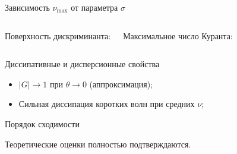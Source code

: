 \documentclass[12pt, aspectratio=169]{beamer}
\begin{document}
\begin{frame}{Зависимость $\nu_{\max}$ от параметра $\sigma$}
\begin{columns}[T]
Поверхность дискриминанта:


\hspace*{-2.5cm}
\scalebox{0.45}{}
% 
Максимальное число Куранта:
\vspace{0cm}
\vspace*{1cm}
\hspace*{0.5cm}
\scalebox{0.5}{}
\end{columns}

\end{frame}


\begin{frame}{Диссипативные и дисперсионные свойства}
\begin{center}
\scalebox{0.75}{}
\end{center}

\vspace{-0.3cm}
\begin{itemize}
\item $|G|\to 1$ при $\theta\to0$ (аппроксимация);
\item Сильная диссипация коротких волн при средних $\nu$;
\end{itemize}
\end{frame}


\begin{frame}{Порядок сходимости}
\begin{center}
\scalebox{0.8}{}
\end{center}



Теоретические оценки полностью подтверждаются.
\end{frame}
\end{document}
